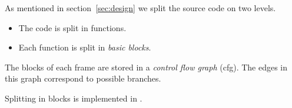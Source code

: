 As mentioned in section~\ref{sec:design} we split the source code on two levels.
\begin{itemize}
\item The code is split in functions.
\item Each function is split in \emph{basic blocks}.
\end{itemize}

The blocks of each frame are stored in a \emph{control flow graph} (cfg). The edges in this graph correspond to possible branches.

Splitting in blocks is implemented in .